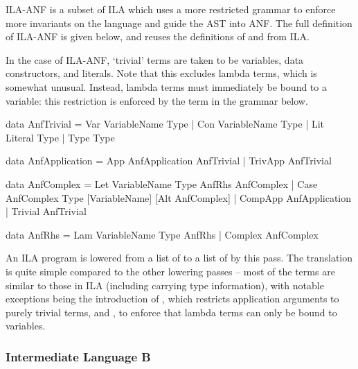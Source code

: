 \documentclass[dissertation.tex]{subfiles}
\begin{document}
{{{            ILA-ANF is a subset of ILA which uses a more restricted grammar to enforce more invariants on the language
            and guide the AST into ANF. The full definition of ILA-ANF is given below, and reuses the definitions of
             and  from ILA.

            In the case of ILA-ANF, `trivial' terms are taken to be variables, data constructors, and literals. Note
            that this excludes lambda terms, which is somewhat unusual. Instead, lambda terms must immediately be bound
            to a variable: this restriction is enforced by the  term in the grammar below.


            \begin{haskellfigure}
            data AnfTrivial = Var VariableName Type
                            | Con VariableName Type
                            | Lit Literal Type
                            | Type Type

            data AnfApplication = App AnfApplication AnfTrivial
                                | TrivApp AnfTrivial

            data AnfComplex = Let VariableName Type AnfRhs AnfComplex
                            | Case AnfComplex Type [VariableName] [Alt AnfComplex]
                            | CompApp AnfApplication
                            | Trivial AnfTrivial

            data AnfRhs = Lam VariableName Type AnfRhs
                        | Complex AnfComplex
            \end{haskellfigure}

            An ILA program is lowered from a list of  to a list of  by
            this pass. The translation is quite simple compared to the other lowering passes -- most of the terms are
            similar to those in ILA (including carrying type information), with notable exceptions being the
            introduction of , which restricts application arguments to purely trivial terms, and
            , to enforce that lambda terms can only be bound to variables.

        }
        \subsubsection{Intermediate Language B}
        {

}}}
\end{document}
